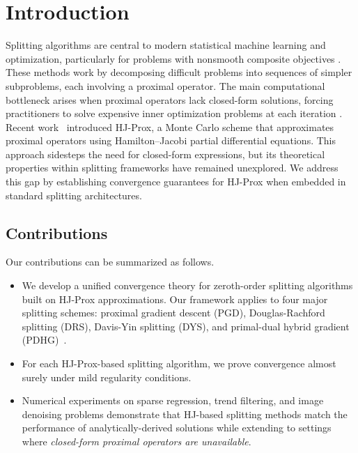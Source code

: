 \documentclass{article}
\theoremstyle{plain}
\theoremstyle{definition}
\theoremstyle{remark}
\begin{document}
\section{Introduction}
Splitting algorithms are central to modern statistical machine learning and optimization, particularly for problems with nonsmooth composite objectives \cite{ParikhBoyd2014}. These methods work by decomposing difficult problems into sequences of simpler subproblems, each involving a proximal operator. The main computational bottleneck arises when proximal operators lack closed-form solutions, forcing practitioners to solve expensive inner optimization problems at each iteration \cite{Tibshirani2017, TibshiraniTaylor2011}.
Recent work~\cite{OsherHeatonFung2023} introduced HJ-Prox, a Monte Carlo scheme that approximates proximal operators using Hamilton–Jacobi partial differential equations. This approach sidesteps the need for closed-form expressions, but its theoretical properties within splitting frameworks have remained unexplored. We address this gap by establishing convergence guarantees for HJ-Prox when embedded in standard splitting architectures.

\subsection{Contributions}
Our contributions can be summarized as follows. 
\begin{itemize}[nosep,leftmargin=*]
    \item We develop a unified convergence theory for zeroth-order splitting algorithms built on HJ-Prox approximations. Our framework applies to four major splitting schemes: proximal gradient descent (PGD), Douglas-Rachford splitting (DRS), Davis-Yin splitting (DYS), and primal-dual hybrid gradient (PDHG)~\cite{ryu2022large}.
    \item For each HJ-Prox-based splitting algorithm, we prove convergence almost surely under mild regularity conditions.
    \item Numerical experiments on sparse regression, trend filtering, and image denoising problems demonstrate that HJ-based splitting methods match the performance of analytically-derived solutions while extending to settings where \emph{closed-form proximal operators are unavailable}.
\end{itemize} 
\end{document}

